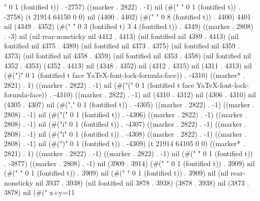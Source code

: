 " 0 1 (fontified t)) . -2757) ((marker . 2822) . -1) nil (#(" " 0 1 (fontified t)) . -2758) (t 21914 64150 0 0) nil (4400 . 4402) (#("		      " 0 8 (fontified t)) . 4400) 4401 nil (4349 . 4352) (#("	  	" 0 3 (fontified t) 3 4 (fontified t)) . 4349) ((marker . 2808) . -3) nil (nil rear-nonsticky nil 4412 . 4413) (nil fontified nil 4389 . 4413) (nil fontified nil 4375 . 4389) (nil fontified nil 4373 . 4375) (nil fontified nil 4359 . 4373) (nil fontified nil 4358 . 4359) (nil fontified nil 4353 . 4358) (nil fontified nil 4352 . 4353) (4352 . 4413) nil (4348 . 4352) nil (4312 . 4315) nil (4311 . 4313) nil (#(")" 0 1 (fontified t face YaTeX-font-lock-formula-face)) . -4310) ((marker* . 2821) . 1) ((marker . 2822) . -1) nil (#("(" 0 1 (fontified t face YaTeX-font-lock-formula-face)) . -4310) ((marker . 2822) . -1) nil (4310 . 4312) nil (4306 . 4310) nil (4305 . 4307) nil (#("," 0 1 (fontified t)) . -4305) ((marker . 2822) . -1) ((marker . 2808) . -1) nil (#("(" 0 1 (fontified t)) . -4306) ((marker . 2822) . -1) ((marker . 2808) . -1) nil (#("i" 0 1 (fontified t)) . -4307) ((marker . 2822) . -1) ((marker . 2808) . -1) nil (#("i" 0 1 (fontified t)) . -4308) ((marker . 2822) . -1) ((marker . 2808) . -1) nil (#(")" 0 1 (fontified t)) . -4309) (t 21914 64105 0 0) ((marker* . 2821) . 1) ((marker . 2822) . -1) ((marker . 2822) . -1) nil (#(" " 0 1 (fontified t)) . -3877) ((marker . 2808) . -1) nil (3909 . 3914) (#(" " 0 1 (fontified t)) . 3909) nil (#("	" 0 1 (fontified t)) . 3909) nil (#("	" 0 1 (fontified t)) . 3909) nil (nil rear-nonsticky nil 3937 . 3938) (nil fontified nil 3878 . 3938) (3878 . 3938) nil (3873 . 3878) nil (#("	    x+y=11 \\\\
